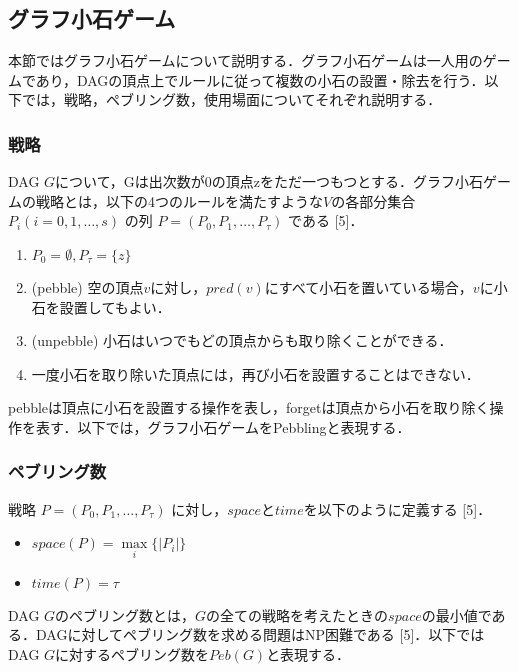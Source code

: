 \documentclass{kuisthesis}           %
\begin{document}
 \subsection{グラフ小石ゲーム}
 本節ではグラフ小石ゲームについて説明する．グラフ小石ゲームは一人用のゲームであり，DAGの頂点上でルールに従って複数の小石の設置・除去を行う．以下では，戦略，ペブリング数，使用場面についてそれぞれ説明する．

 
 \subsubsection{戦略}     %
 DAG $G$について，Gは出次数が0の頂点zをただ一つもつとする．グラフ小石ゲームの戦略とは，以下の4つのルールを満たすような$V$の各部分集合$ P_i (i = 0, 1,   \ldots, s)$ の列 $P = (P_0, P_1,   \ldots, P_{\tau})$ である [5]．

 
 \begin{enumerate}
  \item $P_0 = \emptyset, P_{\tau} = \{ z \}$
  \item (pebble) 空の頂点$v$に対し，$pred(v)$にすべて小石を置いている場合，$v$に小石を設置してもよい．
  \item (unpebble) 小石はいつでもどの頂点からも取り除くことができる．
  \item 一度小石を取り除いた頂点には，再び小石を設置することはできない．
 \end{enumerate}

 
 pebbleは頂点に小石を設置する操作を表し，forgetは頂点から小石を取り除く操作を表す．以下では，グラフ小石ゲームをPebblingと表現する．

 
 \subsubsection{ペブリング数}
 戦略 $P = (P_0, P_1,   \ldots, P_{\tau})$ に対し，$space$と$time$を以下のように定義する [5]．

 
 \begin{itemize}
  \item $space(P) =  \underset{i}{\max} \{ |P_i| \}$
  \item $time(P) = \tau$
 \end{itemize}


 
 DAG $G$のペブリング数とは，$G$の全ての戦略を考えたときの$space$の最小値である．DAGに対してペブリング数を求める問題はNP困難である [5]．以下ではDAG $G$に対するペブリング数を$Peb(G)$と表現する．
\end{document}
